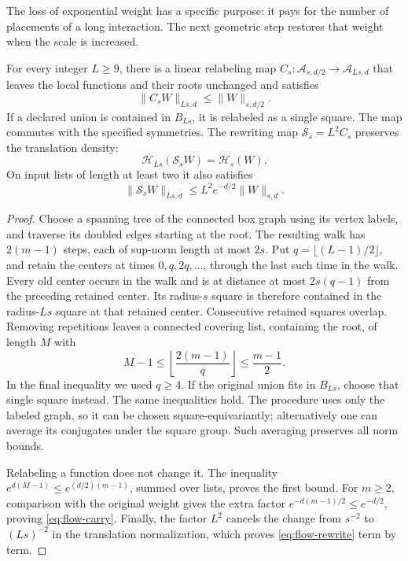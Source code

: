 The loss of exponential weight has a specific purpose: it pays for the
number of placements of a long interaction.  The next geometric step
restores that weight when the scale is increased.

\begin{lemma}\label{lem:flow-compression}
For every integer \(L\ge9\), there is a linear relabeling map
\(C_s:\mathcal A_{s,d/2}\to\mathcal A_{Ls,d}\) that leaves the local
functions and their roots unchanged and satisfies
\[
 \|C_sW\|_{Ls,d}\le\|W\|_{s,d/2}.
\]
If a declared union is contained in \(B_{Ls}\), it is relabeled as a
single square.  The map commutes with the specified symmetries.  The
rewriting map \(\mathcal S_s=L^2C_s\) preserves the translation density:
\begin{equation}\label{eq:flow-rewrite}
 \mathcal H_{Ls}(\mathcal S_sW)=\mathcal H_s(W).
\end{equation}
On input lists of length at least two it also satisfies
\begin{equation}\label{eq:flow-carry}
 \|\mathcal S_sW\|_{Ls,d}
 \le L^2 e^{-d/2}\|W\|_{s,d}.
\end{equation}
\end{lemma}

\begin{proof}
Choose a spanning tree of the connected box graph using its vertex labels,
and traverse its doubled edges starting at the root.  The resulting walk
has \(2(m-1)\) steps, each of sup-norm length at most \(2s\).  Put
\(q=\lfloor(L-1)/2\rfloor\), and retain the centers at times
\(0,q,2q,\ldots\), through the last such time in the walk.  Every old
center occurs in the walk and is at distance at most \(2s(q-1)\) from
the preceding retained center.  Its radius-\(s\) square is therefore
contained in the radius-\(Ls\) square at that retained center.  Consecutive
retained squares overlap.  Removing repetitions leaves a connected
covering list, containing the root, of length \(M\) with
\[
 M-1\le\left\lfloor\frac{2(m-1)}q\right\rfloor
 \le\frac{m-1}{2}.
\]
In the final inequality we used \(q\ge4\).  If the original union fits
in \(B_{Ls}\), choose that single square instead.  The same inequalities
hold.  The procedure uses only the labeled graph, so it can be chosen
square-equivariantly; alternatively one can average its conjugates under
the square group.  Such averaging preserves all norm bounds.

Relabeling a function does not change it.  The inequality
\(e^{d(M-1)}\le e^{(d/2)(m-1)}\), summed over lists, proves the first
bound.  For \(m\ge2\), comparison with the original weight gives the
extra factor \(e^{-d(m-1)/2}\le e^{-d/2}\), proving
\eqref{eq:flow-carry}.  Finally, the factor \(L^2\) cancels the change
from \(s^{-2}\) to \((Ls)^{-2}\) in the translation normalization, which
proves \eqref{eq:flow-rewrite} term by term.
\end{proof}

